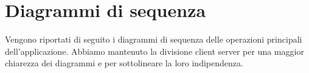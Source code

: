 %


\section{Diagrammi di sequenza} %
\label{sec:diagrammi_di_sequenza}

Vengono riportati di seguito i diagrammi di sequenza delle operazioni principali dell'applicazione. Abbiamo mantenuto la divisione client server per una maggior chiarezza dei diagrammi e per sottolineare la loro indipendenza.
 \newpage \clearpage


